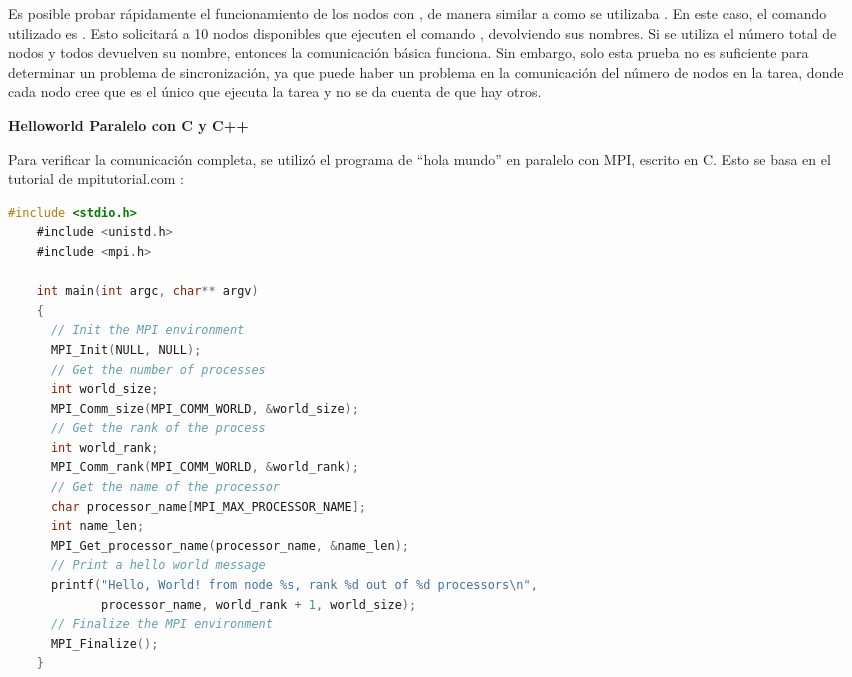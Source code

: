\begin{spacing}{1.5}
  Es posible probar rápidamente el funcionamiento de los nodos con ,
  de manera similar a como se utilizaba . En este caso, el comando
  utilizado es . Esto solicitará a 10 nodos
  disponibles
  que ejecuten el comando , devolviendo sus nombres. Si se
  utiliza
  el número total de nodos y todos devuelven su nombre, entonces la
  comunicación
  básica funciona. Sin embargo, solo esta prueba no es suficiente para
  determinar
  un problema de sincronización, ya que puede haber un problema en la
  comunicación del número de nodos en la tarea, donde cada nodo cree que es el
  único que ejecuta la tarea y no se da cuenta de que hay otros.

  \textbf{Helloworld Paralelo con C y C++}

  Para verificar la comunicación completa, se utilizó el programa de ``hola
  mundo''
  en paralelo con MPI, escrito en C. Esto se basa en el tutorial de
  mpitutorial.com \cite{HelloC}:



  \begin{lstlisting}[language=C]
    #include <stdio.h>
    #include <unistd.h>
    #include <mpi.h>
    
    int main(int argc, char** argv)
    {
      // Init the MPI environment
      MPI_Init(NULL, NULL);
      // Get the number of processes
      int world_size;
      MPI_Comm_size(MPI_COMM_WORLD, &world_size);
      // Get the rank of the process
      int world_rank;
      MPI_Comm_rank(MPI_COMM_WORLD, &world_rank);
      // Get the name of the processor
      char processor_name[MPI_MAX_PROCESSOR_NAME];
      int name_len;
      MPI_Get_processor_name(processor_name, &name_len);
      // Print a hello world message
      printf("Hello, World! from node %s, rank %d out of %d processors\n",
             processor_name, world_rank + 1, world_size);
      // Finalize the MPI environment
      MPI_Finalize();
    }
    \end{lstlisting}


\end{spacing}
